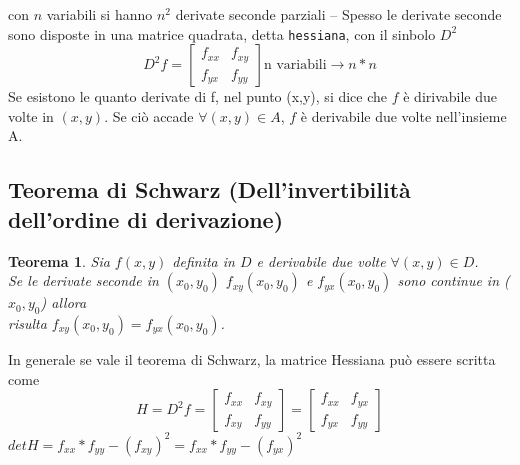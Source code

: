 \documentclass{book}
\newtheorem{teorema}{Teorema}
\begin{document}
con $n$ variabili si hanno $n^2$ derivate seconde parziali -- Spesso le derivate seconde sono disposte in
una matrice quadrata, detta {\tt hessiana}, con il sinbolo $D^2$
\begin{equation}
  D^2f=\begin{bmatrix}
         f_{xx} & f_{xy}\\
         f_{yx} & f_{yy}
       \end{bmatrix}
       \text{n variabili} \to n*n
\end{equation}
Se esistono le quanto derivate di f, nel punto (x,y), si dice che $f$ è dirivabile due volte in $(x,y)$. Se
ciò accade $\forall (x,y)\in A$, $f$ è derivabile due volte nell'insieme A.
\subsection{Teorema di Schwarz (Dell'invertibilità dell'ordine di derivazione)}
\begin{teorema}
  Sia $f(x,y)$ definita in $D$ e derivabile due volte $\forall (x,y) \in D$.\\
  Se le derivate seconde in $(x_0,y_0)$ $f_{xy}(x_0,y_0)$ e $f_{yx}(x_0,y_0)$ sono continue in ($x_0,y_0$) allora\\
  risulta $f_{xy}(x_0,y_0)=f_{yx}(x_0,y_0)$.
\end{teorema}
In generale se vale il teorema di Schwarz, la matrice Hessiana può essere scritta come
\begin{equation*}
  H=D^2f=\begin{bmatrix}
           f_{xx} & f_{xy}\\
           f_{xy} & f_{yy}
         \end{bmatrix}
         = \begin{bmatrix}
             f_{xx} & f_{yx}\\
             f_{yx} & f_{yy}
           \end{bmatrix}
\end{equation*}
$det H= f_{xx}*f_{yy}-(f_{xy})^2=f_{xx}*f_{yy}-(f_{yx})^2$
\end{document}
